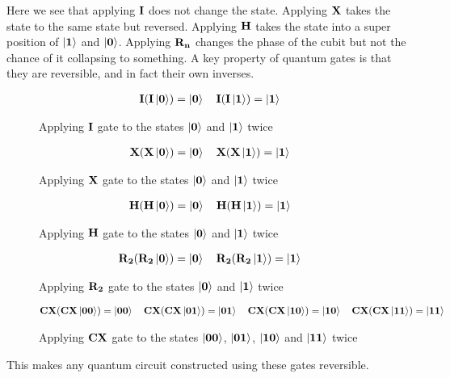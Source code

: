 \vspace{\baselineskip}
\noindent
Here we see that applying $\mathbf{I}$ does not change the state. Applying $\mathbf{X}$ takes the state to the same state but reversed. Applying $\mathbf{H}$ takes the state into a super position of $\ket{\mathbf{1}}$ and $\ket{\mathbf{0}}$. Applying $\mathbf{R_{n}}$ changes the phase of the cubit but not the chance of it collapsing to something. 
A key property of quantum gates is that they are reversible, and in fact their own inverses. 
\begin{figure}[H]
    \centering
    \begin{align*}
        \mathbf{I}(\mathbf{I}\ket{\mathbf{0}})=\ket{\mathbf{0}}\quad
        \mathbf{I}(\mathbf{I}\ket{\mathbf{1}})=\ket{\mathbf{1}}
    \end{align*}
    \caption{Applying $\mathbf{I}$ gate to the states $\ket{\mathbf{0}}$ and $\ket{\mathbf{1}}$ twice}
    \label{fig:i2}
\end{figure}

\begin{figure}[H]
    \centering
    \begin{align*}
        \mathbf{X}(\mathbf{X}\ket{\mathbf{0}})=\ket{\mathbf{0}}\quad
        \mathbf{X}(\mathbf{X}\ket{\mathbf{1}})=\ket{\mathbf{1}}
    \end{align*}
    \caption{Applying $\mathbf{X}$ gate to the states $\ket{\mathbf{0}}$ and $\ket{\mathbf{1}}$ twice}
    \label{fig:x2}
\end{figure}

\begin{figure}[H]
    \centering
    \begin{align*}
        \mathbf{H}(\mathbf{H}\ket{\mathbf{0}})=\ket{\mathbf{0}}\quad
        \mathbf{H}(\mathbf{H}\ket{\mathbf{1}})=\ket{\mathbf{1}}
    \end{align*}
    \caption{Applying $\mathbf{H}$ gate to the states $\ket{\mathbf{0}}$ and $\ket{\mathbf{1}}$ twice}
    \label{fig:h2}
\end{figure}

\begin{figure}[H]
    \centering
    \begin{align*}
        \mathbf{R_{2}}(\mathbf{R_{2}}\ket{\mathbf{0}})=\ket{\mathbf{0}}\quad
        \mathbf{R_{2}}(\mathbf{R_{2}}\ket{\mathbf{1}})=\ket{\mathbf{1}}
    \end{align*}
    \caption{Applying $\mathbf{R_{2}}$ gate to the states $\ket{\mathbf{0}}$ and $\ket{\mathbf{1}}$ twice}
    \label{fig:r22}
\end{figure}

\begin{figure}[H]
    \centering
    \begin{align*}
        \mathbf{CX}(\mathbf{CX}\ket{\mathbf{0}\mathbf{0}})=\ket{\mathbf{0}\mathbf{0}} \quad        
        \mathbf{CX}(\mathbf{CX}\ket{\mathbf{0}\mathbf{1}})=\ket{\mathbf{0}\mathbf{1}} \quad
        \mathbf{CX}(\mathbf{CX}\ket{\mathbf{1}\mathbf{0}})=\ket{\mathbf{1}\mathbf{0}}\quad
        \mathbf{CX}(\mathbf{CX}\ket{\mathbf{1}\mathbf{1}})=\ket{\mathbf{1}\mathbf{1}}
    \end{align*}
    \caption{Applying $\mathbf{CX}$ gate to the states $\ket{\mathbf{0}\mathbf{0}}$, $\ket{\mathbf{0}\mathbf{1}}$, $\ket{\mathbf{1}\mathbf{0}}$ and $\ket{\mathbf{1}\mathbf{1}}$ twice}
    \label{fig:cx2}
\end{figure}
\noindent
This makes any quantum circuit constructed using these gates reversible.

